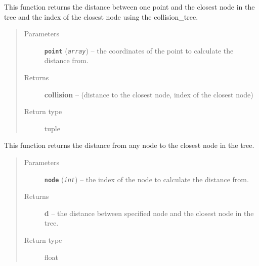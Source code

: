 \documentclass[letterpaper,10pt,english]{sphinxmanual}
\begin{document}
\begin{fulllineitems}

\begin{fulllineitems}
\label{Branch3D:Branch3D.Nodes.collision}
This function returns the distance between one point and the closest node in the tree and the index of the closest node using the collision\_tree.
\begin{quote}\begin{description}
\item[{Parameters}] \leavevmode
\textbf{\texttt{point}} (\emph{\texttt{array}}) -- the coordinates of the point to calculate the distance from.

\item[{Returns}] \leavevmode
\textbf{collision} --
(distance to the closest node, index of the closest node)

\item[{Return type}] \leavevmode
tuple

\end{description}\end{quote}

\end{fulllineitems}


\begin{fulllineitems}
\label{Branch3D:Branch3D.Nodes.distance_from_node}
This function returns the distance from any node to the closest node in the tree.
\begin{quote}\begin{description}
\item[{Parameters}] \leavevmode
\textbf{\texttt{node}} (\emph{\texttt{int}}) -- the index of the node to calculate the distance from.

\item[{Returns}] \leavevmode
\textbf{d} --
the distance between specified node and the closest node in the tree.

\item[{Return type}] \leavevmode
float

\end{description}\end{quote}

\end{fulllineitems}



\end{fulllineitems}
\end{document}
